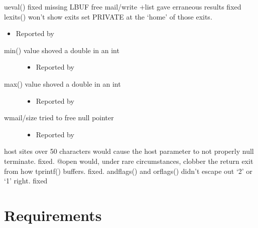 \documentclass[letterpaper,10pt,english]{sphinxmanual}
\begin{document}
\sphinxAtStartPar
ueval() \sphinxhyphen{} fixed missing LBUF free
mail/write +list \sphinxhyphen{} gave erraneous results \sphinxhyphen{} fixed
lexits() \sphinxhyphen{} won’t show exits set PRIVATE at the ‘home’ of those exits.
\begin{itemize}
\item {} 
\sphinxAtStartPar
Reported by 

\end{itemize}
\begin{description}
\item[{min() \sphinxhyphen{} value shoved a double in an int}] \leavevmode\begin{itemize}
\item {} 
\sphinxAtStartPar
Reported by 

\end{itemize}

\item[{max() \sphinxhyphen{} value shoved a double in an int}] \leavevmode\begin{itemize}
\item {} 
\sphinxAtStartPar
Reported by 

\end{itemize}

\item[{wmail/size \sphinxhyphen{} tried to free null pointer}] \leavevmode\begin{itemize}
\item {} 
\sphinxAtStartPar
Reported by 

\end{itemize}

\end{description}

\sphinxAtStartPar
host sites over 50 characters would cause the host parameter to not
properly null terminate.  \sphinxhyphen{} fixed.
@open would, under rare circumstances, clobber the return exit from
how tprintf() buffers. \sphinxhyphen{}fixed.
andflags() and orflags() didn’t escape out ‘2’ or ‘1’ right. \sphinxhyphen{} fixed


\chapter{Requirements}
\label{\detokenize{requirements:requirements}}\label{\detokenize{requirements:id1}}\label{\detokenize{requirements::doc}}
\end{document}
